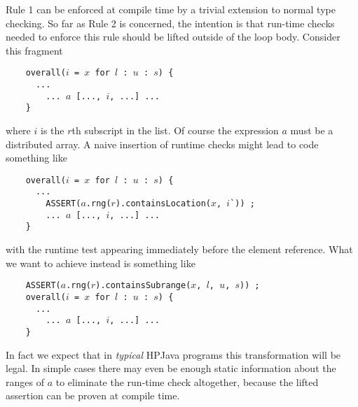 \documentclass{article}
\begin{document}
Rule 1 can be enforced at compile
time by a trivial extension to normal type checking.  So far as Rule 2
is concerned, the intention is that run-time checks
needed to enforce this rule should be lifted outside of the
loop body.  Consider this fragment
\small
\begin{tabbing}
\verb$    overall($$i$\verb$ = $$x$\verb$ for $$l$\verb$ : $$u$\verb$ : $$s$\verb$) {$ \\
\verb$      ...$ \\
\verb$        ... $$a$\verb$ [..., $$i$\verb$, ...] ...$ \\
\verb$    }$
\end{tabbing}
\normalsize
where $i$ is the $r$th subscript in the list.  Of course the expression
$a$ must be a distributed array.  A naive insertion of runtime checks
might lead to code something like
\small
\begin{tabbing}
\verb$    overall($$i$\verb$ = $$x$\verb$ for $$l$\verb$ : $$u$\verb$ : $$s$\verb$) {$ \\
\verb$      ...$ \\
\verb$        ASSERT($$a$\verb$.rng($$r$\verb$).containsLocation($$x$\verb$, $$i$\verb$`)) ;$ \\
\verb$        ... $$a$\verb$ [..., $$i$\verb$, ...] ...$ \\
\verb$    }$
\end{tabbing}
\normalsize
with the runtime test appearing immediately before the element reference.
What we want to achieve instead is something like
\small
\begin{tabbing}
\verb$    ASSERT($$a$\verb$.rng($$r$\verb$).containsSubrange($$x$\verb$, $$l$\verb$, $$u$\verb$, $$s$\verb$)) ;$ \\
\verb$    overall($$i$\verb$ = $$x$\verb$ for $$l$\verb$ : $$u$\verb$ : $$s$\verb$) {$ \\
\verb$      ...$ \\
\verb$        ... $$a$\verb$ [..., $$i$\verb$, ...] ...$ \\
\verb$    }$
\end{tabbing}
\normalsize
In fact we expect that in {\em typical} HPJava programs this
transformation will be legal.  In simple cases there may even be enough
static information about the ranges of $a$ to eliminate the run-time
check altogether, because the lifted assertion can be proven at compile
time.  
\end{document}
